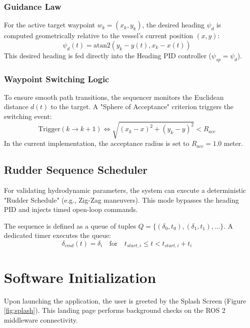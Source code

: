 \documentclass[12pt, a4paper, oneside]{report}
\begin{document}
\subsubsection{Guidance Law}
For the active target waypoint $w_k = (x_k, y_k)$, the desired heading $\psi_d$ is computed geometrically relative to the vessel's current position $(x, y)$:
\begin{equation}
    \psi_d(t) = \text{atan2}(y_k - y(t), x_k - x(t))
\end{equation}
This desired heading is fed directly into the Heading PID controller ($\psi_{sp} = \psi_d$).

\subsubsection{Waypoint Switching Logic}
To ensure smooth path transitions, the sequencer monitors the Euclidean distance $d(t)$ to the target. A "Sphere of Acceptance" criterion triggers the switching event:
\begin{equation}
    \text{Trigger}(k \to k+1) \iff \sqrt{(x_k - x)^2 + (y_k - y)^2} < R_{acc}
\end{equation}
In the current implementation, the acceptance radius is set to $R_{acc} = 1.0$ meter.

\subsection{Rudder Sequence Scheduler}
For validating hydrodynamic parameters, the system can execute a deterministic "Rudder Schedule" (e.g., Zig-Zag maneuvers). This mode bypasses the heading PID and injects timed open-loop commands.

The sequence is defined as a queue of tuples $Q = \{( \delta_0, t_0 ), ( \delta_1, t_1 ), ... \}$. A dedicated timer executes the queue:
\begin{equation}
    \delta_{cmd}(t) = \delta_i \quad \text{for} \quad t_{start,i} \le t < t_{start,i} + t_i
\end{equation}



\section{Software Initialization}
Upon launching the application, the user is greeted by the Splash Screen (Figure \ref{fig:splash}). This landing page performs background checks on the ROS 2 middleware connectivity.
\end{document}
